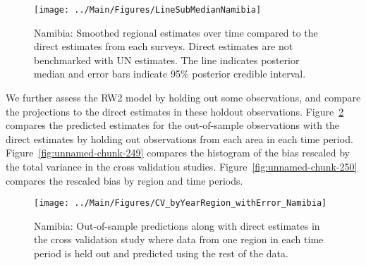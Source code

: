 \documentclass[12pt]{article}\usepackage[]{graphicx}\usepackage[]{color}
\newenvironment{knitrout}{}{} %
\begin{document}
\begin{knitrout}
\color{fgcolor}\begin{figure}[bht]

{\centering \texttt{[image: ../Main/Figures/LineSubMedianNamibia]} 

}

\caption[Namibia]{Namibia: Smoothed regional estimates over time compared to the direct estimates from each surveys. Direct estimates are not benchmarked with UN estimates. The line indicates posterior median and error bars indicate 95\% posterior credible interval.}\label{fig:unnamed-chunk-247}
\end{figure}


\end{knitrout}
We further assess the RW2 model by holding out some observations, and compare the projections to the direct estimates in these holdout observations. Figure~\ref{fig:unnamed-chunk-248} compares the predicted estimates for the out-of-sample observations  with the direct estimates by holding out observations from each area in each time period.  Figure~\ref{fig:unnamed-chunk-249} compares the histogram of the bias rescaled by the total variance in the cross validation studies. Figure~\ref{fig:unnamed-chunk-250} compares the rescaled bias by region and time periods.



 
\begin{knitrout}
\color{fgcolor}\begin{figure}[bht]

{\centering \texttt{[image: ../Main/Figures/CV\_byYearRegion\_withError\_Namibia]} 

}

\caption[Namibia]{Namibia: Out-of-sample predictions along with direct estimates in the cross validation study where data from one region in each time period is held out and predicted using the rest of the data.}\label{fig:unnamed-chunk-248}
\end{figure}


\end{knitrout}
\end{document}
